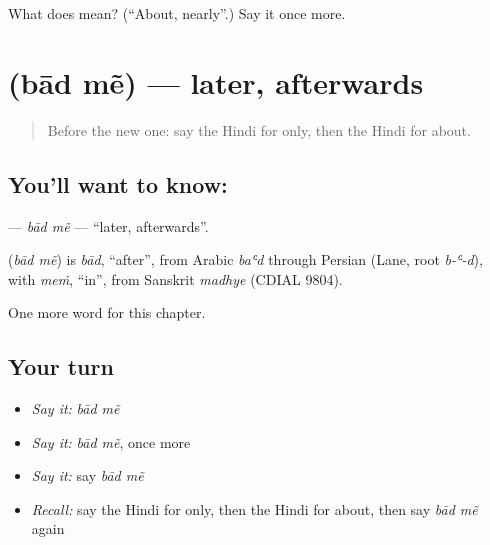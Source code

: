 \begin{tcolorbox}[breakable,colback=teal!4,colframe=teal!35!black,title={Before you move on}]
What does  mean? (\textquotedblleft{}About, nearly\textquotedblright{}.) Say it once more.
\end{tcolorbox}
\section[\texorpdfstring{\hi{बाद} \hi{में} (bād mẽ)}{बाद में (bād mẽ)}]{  (bād mẽ) — later, afterwards}

\label{lesson:HI-C248-badme}



\begin{quote}
Before the new one: say the Hindi for only, then the Hindi for about.
\end{quote}

\subsection*{You'll want to know:  }
\textbf{ } — \emph{bād mẽ} — \textquotedblleft{}later, afterwards\textquotedblright{}.

\begin{cousinweb}
\textbf{ } (\emph{bād mẽ}) is \emph{bād}, \textquotedblleft{}after\textquotedblright{}, from Arabic \emph{baʿd} through Persian (Lane, root \emph{b-ʿ-d}), with \emph{meṁ}, \textquotedblleft{}in\textquotedblright{}, from Sanskrit \emph{madhye} (CDIAL 9804).
\end{cousinweb}

\begin{grammarlens}[title={What you've built}]
One more word for this chapter.
\end{grammarlens}

\subsection*{Your turn}
\begin{itemize}
\raggedright
  \item \emph{Say it:} \emph{bād mẽ}
  \item \emph{Say it:} \emph{bād mẽ}, once more
  \item \emph{Say it:} say \emph{bād mẽ}
  \item \emph{Recall:} say the Hindi for only, then the Hindi for about, then say \emph{bād mẽ} again
\end{itemize}

